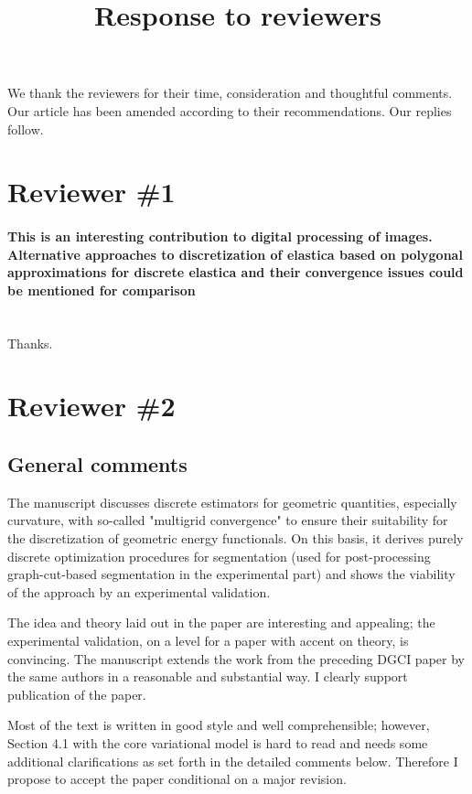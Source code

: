 \documentclass[12pt]{article}
\title{Response to reviewers}
\date{}
\begin{document}
\maketitle

We thank the reviewers for their time, consideration and thoughtful comments. Our article has been amended
according to their recommendations. Our replies follow.

\section{Reviewer \#1}

\paragraph{This is an interesting contribution to digital processing of images. Alternative approaches to discretization of elastica based on polygonal approximations for discrete elastica and their convergence issues could be mentioned for comparison}

~\\
Thanks.

\section{Reviewer \#2}


\subsection{General comments}
The manuscript discusses discrete estimators for geometric quantities,
especially curvature, with so-called "multigrid convergence" to ensure
their suitability for the discretization of geometric energy functionals.
On this basis, it derives purely discrete optimization procedures for
segmentation (used for post-processing graph-cut-based segmentation in the
experimental part) and shows the viability of the approach by an experimental
validation.

The idea and theory laid out in the paper are interesting and appealing; the
experimental validation, on a level for a paper with accent on theory, is
convincing. The manuscript extends the work from the preceding DGCI paper
by the same authors in a reasonable and substantial way. I clearly support
publication of the paper.

Most of the text is written in good style and well comprehensible; however,
Section 4.1 with the core variational model is hard to read and needs some
additional clarifications as set forth in the detailed comments below.
Therefore I propose to accept the paper conditional on a major revision.
\end{document}

